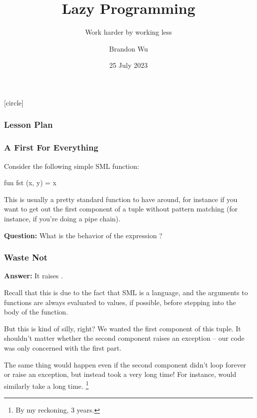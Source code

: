 \documentclass[aspectratio=169, handout]{beamer}
\title{Lazy Programming} %
\subtitle{Work harder by working less} %
\date{25 July 2023} %
\author{Brandon Wu} %
\newif\ifcolorlambda
\begin{document}
\ifweb
    \renewcommand{\pause}{}
\fi

[circle]

{
\begin{frame}[plain]
    \colorlambdatrue
    \titlepage
\end{frame}
}


\begin{frame}[fragile]
  \frametitle{Lesson Plan}

  \tableofcontents
\end{frame}


\begin{frame}[fragile]
  \frametitle{A First For Everything}

  Consider the following simple SML function:
  \begin{codeblock}
    fun fst (x, y) = x
  \end{codeblock}

  \pause
  \vspace{\fill}

  This is usually a pretty standard function to have around, for instance
  if you want to get out the first component of a tuple without pattern
  matching (for instance, if you're doing a pipe chain).

  \pause
  \vspace{\fill}

  \textbf{Question:} What is the behavior of the expression ?
\end{frame}

\begin{frame}[fragile]
  \frametitle{Waste Not}

  \textbf{Answer:} It raises .

  \pause
  \vspace{\fill}

  Recall that this is due to the fact that SML is a  language,
  and the arguments to functions are always evaluated to values, if possible, before
  stepping into the body of the function.

  \pause
  \vspace{\fill}

  But this is kind of silly, right? We wanted the first component of this tuple. It
  shouldn't matter whether the second component raises an exception -- our code was
  only concerned with the first part.

  \pause
  \vspace{\fill}

  The same thing would happen even if the second component didn't loop forever or
  raise an exception, but instead took a very long time! For instance,
   would similarly take a long time.
  \footnote{By my reckoning, 3 years.}
\end{frame}
\end{document}
